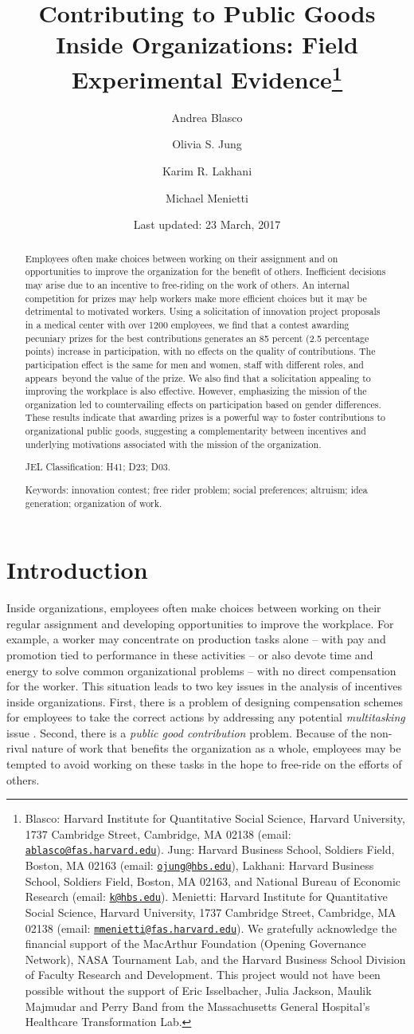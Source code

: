 \documentclass[11pt, titlepage]{article}
\institute{}
\title{Contributing to Public Goods Inside Organizations: Field Experimental
Evidence\thanks{Blasco: Harvard Institute for Quantitative Social Science, Harvard
University, 1737 Cambridge Street, Cambridge, MA 02138 (email:
\href{mailto:ablasco@fas.harvard.edu}{\nolinkurl{ablasco@fas.harvard.edu}}).
Jung: Harvard Business School, Soldiers Field, Boston, MA 02163 (email:
\href{mailto:ojung@hbs.edu}{\nolinkurl{ojung@hbs.edu}}), Lakhani:
Harvard Business School, Soldiers Field, Boston, MA 02163, and National
Bureau of Economic Research (email:
\href{mailto:k@hbs.edu}{\nolinkurl{k@hbs.edu}}). Menietti: Harvard
Institute for Quantitative Social Science, Harvard University, 1737
Cambridge Street, Cambridge, MA 02138 (email:
\href{mailto:mmenietti@fas.harvard.edu}{\nolinkurl{mmenietti@fas.harvard.edu}}).
We gratefully acknowledge the financial support of the MacArthur
Foundation (Opening Governance Network), NASA Tournament Lab, and the
Harvard Business School Division of Faculty Research and Development.
This project would not have been possible without the support of Eric
Isselbacher, Julia Jackson, Maulik Majmudar and Perry Band from the
Massachusetts General Hospital's Healthcare Transformation Lab.}}
\author{Andrea Blasco \and Olivia S. Jung \and Karim R. Lakhani \and Michael Menietti}
\date{Last updated: 23 March, 2017}
\begin{document}
\maketitle
\begin{abstract}
Employees often make choices between working on their assignment and on
opportunities to improve the organization for the benefit of others.
Inefficient decisions may arise due to an incentive to free-riding on
the work of others. An internal competition for prizes may help workers
make more efficient choices but it may be detrimental to motivated
workers. Using a solicitation of innovation project proposals in a
medical center with over 1200 employees, we find that a contest awarding
pecuniary prizes for the best contributions generates an 85 percent (2.5
percentage points) increase in participation, with no effects on the
quality of contributions. The participation effect is the same for men
and women, staff with different roles, and appears~beyond the value of
the prize. We also find that a solicitation appealing to improving the
workplace is also effective. However, emphasizing the mission of the
organization led to countervailing effects on participation based on
gender differences. These results indicate that awarding prizes is a
powerful way to foster contributions to organizational public goods,
suggesting a complementarity between incentives and underlying
motivations associated with the mission of the organization.

\smallskip\noindent 
JEL Classification: H41; D23; D03.

\smallskip\noindent 
Keywords: innovation contest; free rider problem; social preferences; altruism; idea generation; organization of work.
\end{abstract}


\clearpage

\section{Introduction}\label{introduction}

Inside organizations, employees often make choices between working on
their regular assignment and developing opportunities to improve the
workplace. For example, a worker may concentrate on production tasks
alone -- with pay and promotion tied to performance in these activities
-- or also devote time and energy to solve common organizational
problems -- with no direct compensation for the worker. This situation
leads to two key issues in the analysis of incentives inside
organizations. First, there is a problem of designing compensation
schemes for employees to take the correct actions by addressing any
potential \emph{multitasking} issue
\citep{holmstrom1991multitask, hellmann2011incentives, manso2011motivating}.
Second, there is a \emph{public good contribution} problem. Because of
the non-rival nature of work that benefits the organization as a whole,
employees may be tempted to avoid working on these tasks in the hope to
free-ride on the efforts of others.
\end{document}
